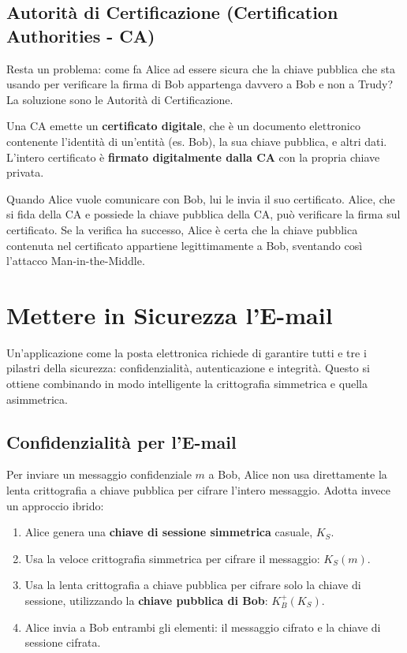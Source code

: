\subsection{Autorità di Certificazione (Certification Authorities - CA)}
Resta un problema: come fa Alice ad essere sicura che la chiave pubblica che sta usando per verificare la firma di Bob appartenga davvero a Bob e non a Trudy? La soluzione sono le Autorità di Certificazione.


Una CA emette un \textbf{certificato digitale}, che è un documento elettronico contenente l'identità di un'entità (es. Bob), la sua chiave pubblica, e altri dati. L'intero certificato è \textbf{firmato digitalmente dalla CA} con la propria chiave privata.

Quando Alice vuole comunicare con Bob, lui le invia il suo certificato. Alice, che si fida della CA e possiede la chiave pubblica della CA, può verificare la firma sul certificato. Se la verifica ha successo, Alice è certa che la chiave pubblica contenuta nel certificato appartiene legittimamente a Bob, sventando così l'attacco Man-in-the-Middle.

\section{Mettere in Sicurezza l'E-mail}
Un'applicazione come la posta elettronica richiede di garantire tutti e tre i pilastri della sicurezza: confidenzialità, autenticazione e integrità. Questo si ottiene combinando in modo intelligente la crittografia simmetrica e quella asimmetrica.

\subsection{Confidenzialità per l'E-mail}
Per inviare un messaggio confidenziale $m$ a Bob, Alice non usa direttamente la lenta crittografia a chiave pubblica per cifrare l'intero messaggio. Adotta invece un approccio ibrido:
\begin{enumerate}
    \item Alice genera una \textbf{chiave di sessione simmetrica} casuale, $K_S$.
    \item Usa la veloce crittografia simmetrica per cifrare il messaggio: $K_S(m)$.
    \item Usa la lenta crittografia a chiave pubblica per cifrare solo la chiave di sessione, utilizzando la \textbf{chiave pubblica di Bob}: $K_B^+(K_S)$.
    \item Alice invia a Bob entrambi gli elementi: il messaggio cifrato e la chiave di sessione cifrata.
\end{enumerate}

